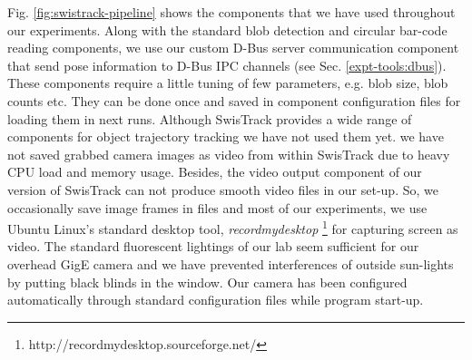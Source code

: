 Fig. \ref{fig:swistrack-pipeline} shows the components that we have used throughout our experiments. Along with the standard blob detection and   circular bar-code reading components, we use our custom D-Bus server communication component that send pose information to D-Bus IPC channels (see Sec.  \ref{expt-tools:dbus}). These components require a little tuning of few parameters, e.g. blob size, blob counts etc. They can be done once and saved in component configuration files for loading them in next runs. Although SwisTrack provides a wide range of components for object trajectory tracking we have not used them yet. we have not saved grabbed camera images as video  from within SwisTrack due to heavy CPU load and memory usage.  Besides, the video output component of  our version of SwisTrack can not produce smooth video files in our set-up.  So, we occasionally save image frames in files and most of our experiments, we use Ubuntu Linux's standard desktop tool, {\em recordmydesktop} \footnote{http://recordmydesktop.sourceforge.net/}  for capturing screen as video.  The standard fluorescent lightings of our lab seem sufficient for our overhead GigE camera and we have prevented interferences of outside sun-lights by putting black blinds  in the window. Our camera has been configured automatically through standard configuration files while program start-up. 
